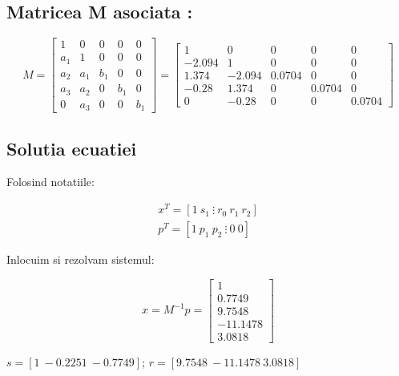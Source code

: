 \documentclass[12pt,english]{article}
\begin{document}
\subsection {Matricea M asociata : }
\begin{center}
  \begin{equation*}
  M=\begin{bmatrix}
  1 		& 0 		& 0 		& 0 		& 0\\
  a_{1} 	& 1 		& 0 		& 0 		& 0\\
  a_{2} 	& a_{1} 	& b_{1} 	& 0 		& 0\\
  a_{3} 	& a_{2} 	& 0 		& b_{1} 	& 0\\
  0 		& a_{3} 	& 0 		& 0 		& b_{1}
  \end{bmatrix} =\begin{bmatrix}
  1 		& 0 		& 0 		& 0 		& 0\\
  -2.094  	& 1 		& 0 		& 0 		& 0\\
  1.374 	& -2.094 	& 0.0704 	& 0 		& 0\\
  -0.28 	& 1.374 	& 0 		& 0.0704 	& 0\\
  0 		& -0.28 	& 0 		& 0 		& 0.0704
  \end{bmatrix}
  \end{equation*}
\end{center}
\subsection {Solutia ecuatiei}
Folosind notatiile:
\begin{center}
  \begin{gather*}
  x^{T} =[ 1\ s_{1} \ \vdots \ r_{0} \ r_{1} \ r_{2}]\\
  p^{T} =[ 1\ p_{1} \ p_{2} \ \vdots \ 0 \ 0]
  \end{gather*}
\end{center}

Inlocuim si rezolvam sistemul:
\begin{center}
  \begin{equation*}
  x=M^{-1} p=\begin{bmatrix}
  1\\
  0.7749\\
  9.7548\\
  -11.1478\\
  3.0818
  \end{bmatrix}
  \end{equation*}
\end{center}

$s = [1\ -0.2251\ -0.7749]$;
$r = [9.7548\ -11.1478\ 3.0818]$
\end{document}
